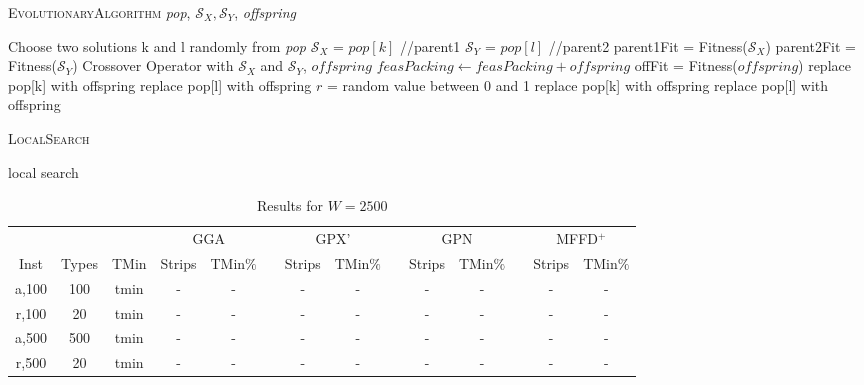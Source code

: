 \documentclass{elsarticle}
\begin{document}
\begin{algorithm}
\caption{\textsc{EvolutionaryAlgorithm} \textit{pop}, $\mathcal{S}_X, \mathcal{S}_Y$, \textit{offspring}}
\begin{algorithmic}
	\State Choose two solutions k and l randomly from \textit{pop}
	\State $\mathcal{S}_X$ = $pop[k]$ //parent1
	\State $\mathcal{S}_Y$ = $pop[l]$ //parent2
	\State parent1Fit = Fitness($\mathcal{S}_X$)
	\State parent2Fit = Fitness($\mathcal{S}_Y$)
	\Run Crossover Operator with $\mathcal{S}_X$ and $\mathcal{S}_Y$, \Output $offspring$
	\State $feasPacking \gets feasPacking + offspring$
	\State offFit = Fitness($offspring$)
		\State replace pop[k] with offspring
		\State replace pop[l] with offspring
		\State $r$ = random value between 0 and 1
			\State replace pop[k] with offspring
			\State replace pop[l] with offspring
		\EndIf		
	\EndIf	
\end{algorithmic}	
\end{algorithm}	

\begin{algorithm}
	\caption{\textsc{LocalSearch}}
	\begin{algorithmic}
		\State local search
	\end{algorithmic}	
\end{algorithm}

\begin{table}[h!]
	\centering
	\caption{Results for $W=2500$}
	\begin{tabular}{cccccccccccccc}\toprule
		& & &\multicolumn{2}{c}{GGA} &\phantom{a}& \multicolumn{2}{c}{GPX'} &\phantom{a}& \multicolumn{2}{c}{GPN} &\phantom{a}& \multicolumn{2}{c}{MFFD$^+$} \\
		\cmidrule{4-5} \cmidrule{7-8} \cmidrule{10-11} \cmidrule{13-14}
		Inst & Types &TMin & Strips & TMin$\%$ && Strips & TMin$\%$ && Strips & TMin$\%$ && Strips & TMin$\%$\\ \midrule	
		a,100 & 100 & tmin & - & - && - & - && - & - && - & -\\
		r,100 & 20 & tmin & - & - && - & - && - & - && - & -\\
		\midrule
		a,500 & 500 & tmin & - & - && - & - && - & - && - & -\\
		r,500 & 20 & tmin & - & - && - & - && - & - && - & -\\
		\bottomrule
	\end{tabular}	
	\label{table:n=500}
\end{table}
\end{document}
